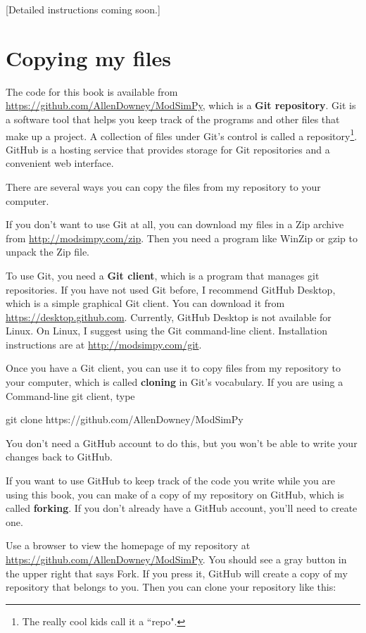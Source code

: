 \documentclass[12pt]{book}
\theoremstyle{exercise}
\begin{document}
[Detailed instructions coming soon.]



\section{Copying my files}

The code for this book is available from
\url{https://github.com/AllenDowney/ModSimPy}, which is a {\bf Git repository}.  Git is a software tool that helps you keep track of the programs and other files that make up a project.  A collection of files under Git's control is called a repository\footnote{The really cool kids call it a ``repo".}.  GitHub is a hosting service that provides storage for Git repositories and a convenient web interface.

There are several ways you can copy the files from my repository to your computer.

If you don't want to use Git at all, you can download my files
in a Zip archive from \url{http://modsimpy.com/zip}.  Then you need a program like WinZip or gzip to unpack the Zip file.

To use Git, you need a {\bf Git client}, which is a program that manages git repositories.  If you have not used Git before, I recommend GitHub Desktop, which is a simple graphical Git client.  You can download it from \url{https://desktop.github.com}.  Currently, GitHub Desktop is not available for Linux.  On Linux, I suggest using the Git command-line client.  Installation instructions are at \url{http://modsimpy.com/git}.

Once you have a Git client, you can use it to copy files from my repository to your computer, which is called {\bf cloning} in Git's vocabulary.  If you are using a Command-line git client, type

\begin{python}
git clone https://github.com/AllenDowney/ModSimPy
\end{python}

You don't need a GitHub account to do this, but you won't be able to write your changes back to GitHub.

If you want to use GitHub to keep track of the code you write while you are using this book, you can make of a copy of my repository on GitHub, which is called {\bf forking}.  If you don't already have a GitHub account, you'll need to create one.  

Use a browser to view the homepage of my repository at \url{https://github.com/AllenDowney/ModSimPy}.   You should see a gray button in the upper right that says {\sf Fork}.  If you press it, GitHub will create a copy of my repository that belongs to you.  Then you can clone your repository like this:
\end{document}
